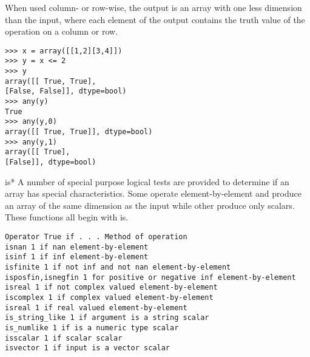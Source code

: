 \documentclass[11pt]{article} %
\begin{document}
When used column- or row-wise, the output is an array with one less dimension than the input, where each element
of the output contains the truth value of the operation on a column or row.
\begin{framed}
\begin{verbatim}
>>> x = array([[1,2][3,4]])
>>> y = x <= 2
>>> y
array([[ True, True],
[False, False]], dtype=bool)
>>> any(y)
True
>>> any(y,0)
array([[ True, True]], dtype=bool)
>>> any(y,1)
array([[ True],
[False]], dtype=bool)
\end{verbatim}
\end{framed}

is*
A number of special purpose logical tests are provided to determine if an array has special characteristics.
Some operate element-by-element and produce an array of the same dimension as the input while other
produce only scalars. These functions all begin with is.

\begin{verbatim}
Operator True if . . . Method of operation
isnan 1 if nan element-by-element
isinf 1 if inf element-by-element
isfinite 1 if not inf and not nan element-by-element
isposfin,isnegfin 1 for positive or negative inf element-by-element
isreal 1 if not complex valued element-by-element
iscomplex 1 if complex valued element-by-element
isreal 1 if real valued element-by-element
is_string_like 1 if argument is a string scalar
is_numlike 1 if is a numeric type scalar
isscalar 1 if scalar scalar
isvector 1 if input is a vector scalar
\end{verbatim}
\end{document}

